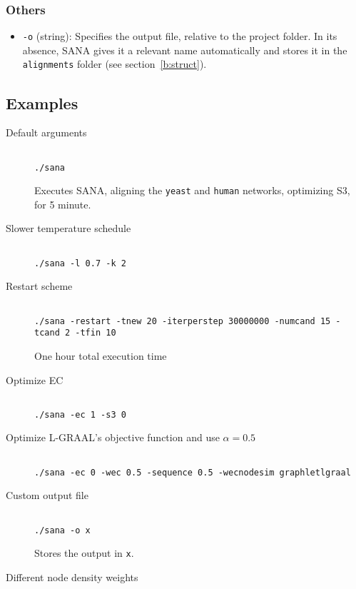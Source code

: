 \documentclass[]{article}
\begin{document}
\subsubsection*{Others}
\begin{itemize}
\item\texttt{-o} (string): Specifies the output file, relative to the project folder. In its absence, SANA gives it a relevant name automatically and stores it in the \texttt{alignments} folder (see section~\ref{b:struct}).
\end{itemize}

\subsection{Examples}

\begin{description}
\item[Default arguments]
\begin{verbatim}

./sana
\end{verbatim}
Executes SANA, aligning the \texttt{yeast} and \texttt{human} networks, optimizing S3, for 5 minute.
\item[Slower temperature schedule]
\begin{verbatim}

./sana -l 0.7 -k 2
\end{verbatim}
\item[Restart scheme]
\begin{verbatim}

./sana -restart -tnew 20 -iterperstep 30000000 -numcand 15 -tcand 2 -tfin 10
\end{verbatim}
One hour total execution time
\item[Optimize EC]
\begin{verbatim}

./sana -ec 1 -s3 0
\end{verbatim}
\item[Optimize L-GRAAL's objective function and use $\alpha=0.5$]
\begin{verbatim}

./sana -ec 0 -wec 0.5 -sequence 0.5 -wecnodesim graphletlgraal
\end{verbatim}
\item[Custom output file]
\begin{verbatim}

./sana -o x
\end{verbatim}
Stores the output in \texttt{x}.
\item[Different node density weights]
\begin{verbatim}


\end{verbatim}
\end{description}
\end{document}
